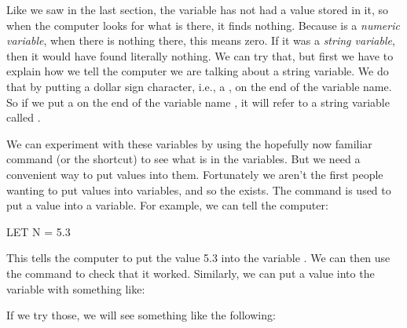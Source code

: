 
Like we saw in the last section, the variable  has not had a value stored in it, so when the computer looks for
what is there, it finds nothing.  Because  is a {\em numeric variable}, when there is
nothing there, this means zero.  If it was a {\em string variable}, then it would have found literally nothing.
We can try that, but first we have to explain how we tell the computer we are talking about a string variable.  We do that by
putting a dollar sign character, i.e., a \screentextwide{\$}, on the end of the variable name. So if we put a \screentextwide{\$} on
the end of the variable name , it will refer to a string variable called .

\needspace{4cm} %
We can experiment with these variables by using the hopefully now familiar
 command (or the  shortcut)
to see what is in the variables. But we need a convenient way to put
values into them.  Fortunately we aren't the first people wanting to
put values into variables, and so the
 exists.
The  command is used to put a value into a
variable.  For example, we can tell the computer:

\begin{screenoutput}
  LET N = 5.3
\end{screenoutput}

\needspace{4cm} %
This tells the computer to put the value 5.3 into the variable
.  We can then use the 
command to check that it worked.  Similarly, we can put a value into
the variable  with something like:


\needspace{4cm} %
If we try those, we will see something like the following:


